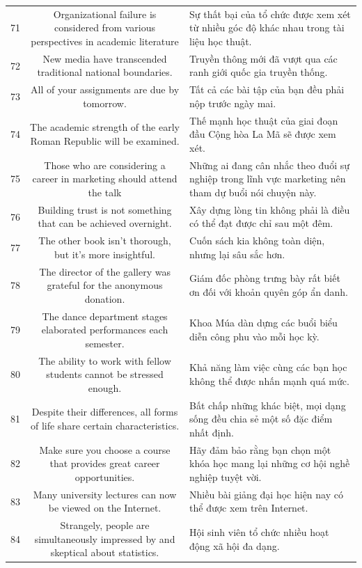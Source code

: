 \documentclass[11pt,a4paper]{article}
\begin{document}
\begin{longtable}{N S M}
71 & Organizational failure is considered from various perspectives in academic literature & Sự thất bại của tổ chức được xem xét từ nhiều góc độ khác nhau trong tài liệu học thuật. \\
72 & New media have transcended traditional national boundaries. & Truyền thông mới đã vượt qua các ranh giới quốc gia truyền thống. \\
73 & All of your assignments are due by tomorrow. & Tất cả các bài tập của bạn đều phải nộp trước ngày mai. \\
74 & The academic strength of the early Roman Republic will be examined. & Thế mạnh học thuật của giai đoạn đầu Cộng hòa La Mã sẽ được xem xét. \\
75 & Those who are considering a career in marketing should attend the talk & Những ai đang cân nhắc theo đuổi sự nghiệp trong lĩnh vực marketing nên tham dự buổi nói chuyện này. \\
76 & Building trust is not something that can be achieved overnight. & Xây dựng lòng tin không phải là điều có thể đạt được chỉ sau một đêm. \\
77 & The other book isn't thorough, but it's more insightful. & Cuốn sách kia không toàn diện, nhưng lại sâu sắc hơn. \\
78 & The director of the gallery was grateful for the anonymous donation. & Giám đốc phòng trưng bày rất biết ơn đối với khoản quyên góp ẩn danh. \\
79 & The dance department stages elaborated performances each semester. & Khoa Múa dàn dựng các buổi biểu diễn công phu vào mỗi học kỳ. \\
80 & The ability to work with fellow students cannot be stressed enough. & Khả năng làm việc cùng các bạn học không thể được nhấn mạnh quá mức. \\
81 & Despite their differences, all forms of life share certain characteristics. & Bất chấp những khác biệt, mọi dạng sống đều chia sẻ một số đặc điểm nhất định. \\
82 & Make sure you choose a course that provides great career opportunities. & Hãy đảm bảo rằng bạn chọn một khóa học mang lại những cơ hội nghề nghiệp tuyệt vời. \\
83 & Many university lectures can now be viewed on the Internet. & Nhiều bài giảng đại học hiện nay có thể được xem trên Internet. \\
84 & Strangely, people are simultaneously impressed by and skeptical about statistics. & Hội sinh viên tổ chức nhiều hoạt động xã hội đa dạng. \\

\end{longtable}
\end{document}
